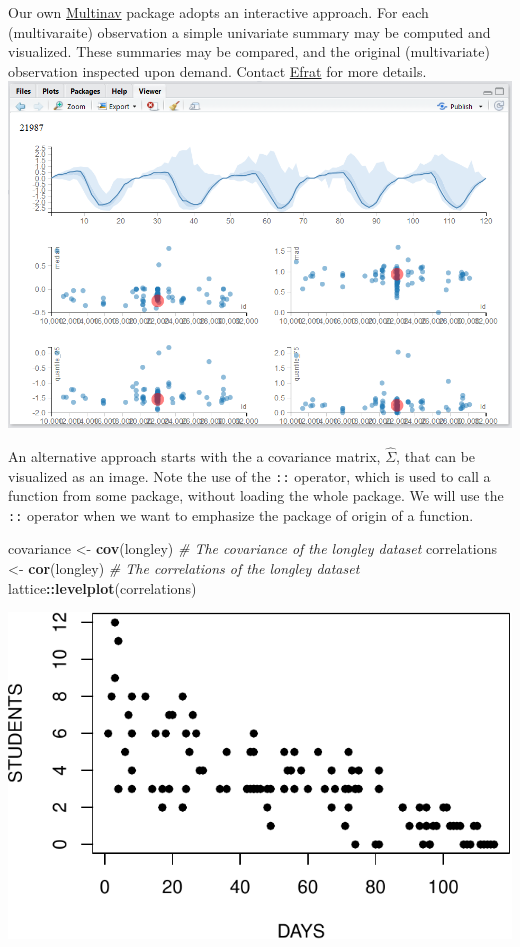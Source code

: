 \documentclass[]{book}
\newenvironment{Shaded}{\begin{snugshade}}{\end{snugshade}}
\newcommand{\KeywordTok}[1]{\textcolor[rgb]{0.13,0.29,0.53}{\textbf{#1}}}
\newcommand{\StringTok}[1]{\textcolor[rgb]{0.31,0.60,0.02}{#1}}
\newcommand{\CommentTok}[1]{\textcolor[rgb]{0.56,0.35,0.01}{\textit{#1}}}
\newcommand{\OperatorTok}[1]{\textcolor[rgb]{0.81,0.36,0.00}{\textbf{#1}}}
\newcommand{\NormalTok}[1]{#1}
\theoremstyle{definition}
\theoremstyle{definition}
\theoremstyle{definition}
\theoremstyle{remark}
\begin{document}
Our own \href{https://github.com/EfratVil/MultiNav}{Multinav} package
adopts an interactive approach. For each (multivaraite) observation a
simple univariate summary may be computed and visualized. These
summaries may be compared, and the original (multivariate) observation
inspected upon demand. Contact
\href{http://efratvil.github.io/home/index.html}{Efrat} for more
details.\\
\includegraphics{art/multinav.png}

An alternative approach starts with the a covariance matrix,
\(\hat \Sigma\), that can be visualized as an image. Note the use of the
\texttt{::} operator, which is used to call a function from some
package, without loading the whole package. We will use the \texttt{::}
operator when we want to emphasize the package of origin of a function.

\begin{Shaded}
\begin{Highlighting}[]
\NormalTok{covariance <-}\StringTok{ }\KeywordTok{cov}\NormalTok{(longley) }\CommentTok{# The covariance of the longley dataset}
\NormalTok{correlations <-}\StringTok{ }\KeywordTok{cor}\NormalTok{(longley) }\CommentTok{# The correlations of the longley dataset}
\NormalTok{lattice}\OperatorTok{::}\KeywordTok{levelplot}\NormalTok{(correlations)}
\end{Highlighting}
\end{Shaded}

\includegraphics[width=0.5\linewidth]{Rcourse_files/figure-latex/unnamed-chunk-143-1}
\end{document}

